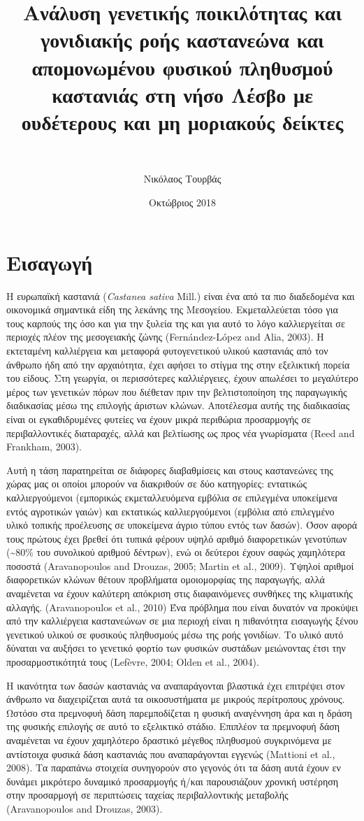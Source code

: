 \documentclass[12pt,a4paper,]{report}
\title{Ανάλυση γενετικής ποικιλότητας και γονιδιακής ροής καστανεώνα και
απομονωμένου φυσικού πληθυσμού καστανιάς στη νήσο Λέσβο με ουδέτερους
και μη μοριακούς δείκτες}
\subtitle{~}
\author{Νικόλαος Τουρβάς}
\date{Οκτώβριος 2018}
\begin{document}
\maketitle

\section{Εισαγωγή}

Η ευρωπαϊκή καστανιά (\emph{Castanea sativa} Mill.) είναι ένα από τα πιο
διαδεδομένα και οικονομικά σημαντικά είδη της λεκάνης της Μεσογείου.
Εκμεταλλεύεται τόσο για τους καρπούς της όσο και για την ξυλεία της και
για αυτό το λόγο καλλιεργείται σε περιοχές πλέον της μεσογειακής ζώνης
(Fernández-López and Alia, 2003). Η εκτεταμένη καλλιέργεια και μεταφορά
φυτογενετικού υλικού καστανιάς από τον άνθρωπο ήδη από την αρχαιότητα,
έχει αφήσει το στίγμα της στην εξελικτική πορεία του είδους. Στη
γεωργία, οι περισσότερες καλλιέργειες, έχουν απωλέσει το μεγαλύτερο
μέρος των γενετικών πόρων που διέθεταν πριν την βελτιστοποίηση της
παραγωγικής διαδικασίας μέσω της επιλογής άριστων κλώνων. Αποτέλεσμα
αυτής της διαδικασίας είναι οι εγκαθιδρυμένες φυτείες να έχουν μικρά
περιθώρια προσαρμογής σε περιβαλλοντικές διαταραχές, αλλά και βελτίωσης
ως προς νέα γνωρίσματα (Reed and Frankham, 2003).

Αυτή η τάση παρατηρείται σε διάφορες διαβαθμίσεις και στους καστανεώνες
της χώρας μας οι οποίοι μπορούν να διακριθούν σε δύο κατηγορίες:
εντατικώς καλλιεργούμενοι (εμπορικώς εκμεταλλευόμενα εμβόλια σε
επιλεγμένα υποκείμενα εντός αγροτικών γαιών) και εκτατικώς
καλλιεργούμενοι (εμβόλια από επιλεγμένο υλικό τοπικής προέλευσης σε
υποκείμενα άγριο τύπου εντός των δασών). Όσον αφορά τους πρώτους έχει
βρεθεί ότι τυπικά φέρουν υψηλό αριθμό διαφορετικών γενοτύπων
(\textasciitilde{}80\% του συνολικού αριθμού δέντρων), ενώ οι δεύτεροι
έχουν σαφώς χαμηλότερα ποσοστά (Aravanopoulos and Drouzas, 2005; Martin
et al., 2009). Υψηλοί αριθμοί διαφορετικών κλώνων θέτουν προβλήματα
ομοιομορφίας της παραγωγής, αλλά αναμένεται να έχουν καλύτερη απόκριση
στις διαφαινόμενες συνθήκες της κλιματικής αλλαγής. (Aravanopoulos et
al., 2010) Ένα πρόβλημα που είναι δυνατόν να προκύψει από την
καλλιέργεια καστανεώνων σε μια περιοχή είναι η πιθανότητα εισαγωγής
ξένου γενετικού υλικού σε φυσικούς πληθυσμούς μέσω της ροής γονιδίων. Το
υλικό αυτό δύναται να αυξήσει το γενετικό φορτίο των φυσικών συστάδων
μειώνοντας έτσι την προσαρμοστικότητά τους (Lefèvre, 2004; Olden et al.,
2004).

Η ικανότητα των δασών καστανιάς να αναπαράγονται βλαστικά έχει επιτρέψει
στον άνθρωπο να διαχειρίζεται αυτά τα οικοσυστήματα με μικρούς
περίτροπους χρόνους. Ωστόσο στα πρεμνοφυή δάση παρεμποδίζεται η φυσική
αναγέννηση άρα και η δράση της φυσικής επιλογής σε αυτό το εξελικτικό
στάδιο. Επιπλέον τα πρεμνοφυή δάση αναμένεται να έχουν χαμηλότερο
δραστικό μέγεθος πληθυσμού συγκρινόμενα με αντίστοιχα φυσικά δάση
καστανιάς που αναπαράγονται εγγενώς (Mattioni et al., 2008). Τα παραπάνω
στοιχεία συνηγορούν στο γεγονός ότι τα δάση αυτά έχουν εν δυνάμει
μικρότερο δυναμικό προσαρμογής ή/και παρουσιάζουν χρονική υστέρηση στην
προσαρμογή σε περιπτώσεις ταχείας περιβαλλοντικής μεταβολής
(Aravanopoulos and Drouzas, 2003).
\end{document}
